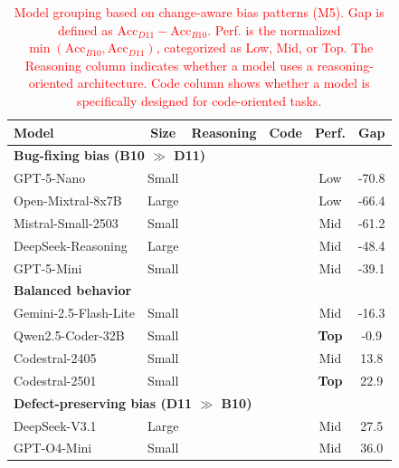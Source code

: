 \documentclass[authoryear,final,5p,times,twocolumn]{elsarticle}
\newcommand{\cmark}{\textcolor{green!60!black}{\ding{51}}}
\newcommand{\xmark}{\textcolor{red}{\ding{55}}}
\theoremstyle{plain}
\begin{document}
\begin{table}[!htbp]
\centering
\caption{
\textcolor{red}{Model grouping based on change-aware bias patterns (M5). Gap is defined as $\text{Acc}_{D11} - \text{Acc}_{B10}$. 
Perf. is the normalized $\min(\text{Acc}_{B10}, \text{Acc}_{D11})$, categorized as Low, Mid, or Top. The Reasoning column indicates whether a model uses a reasoning-oriented architecture. Code column shows whether a model is specifically designed for code-oriented tasks.}}
\label{tab:model_bias_groups}
\scriptsize
\setlength{\tabcolsep}{5pt}
\renewcommand{\arraystretch}{1.2}

\begin{tabular}{l c c c c c}
\toprule
\textbf{Model} & \textbf{Size} & \textbf{Reasoning} & \textbf{Code} & \textbf{Perf.} & \textbf{Gap} \\
\midrule

\multicolumn{6}{l}{\textbf{Bug-fixing bias (B10 $\gg$ D11)}} \\
\midrule
GPT-5-Nano & Small & \xmark & \xmark & Low & -70.8 \\
Open-Mixtral-8x7B & Large & \xmark & \xmark & Low & -66.4 \\
Mistral-Small-2503 & Small & \xmark & \xmark & Mid & -61.2 \\
DeepSeek-Reasoning & Large & \cmark & \xmark & Mid & -48.4 \\
GPT-5-Mini & Small & \xmark & \xmark & Mid & -39.1 \\
\midrule

\multicolumn{6}{l}{\textbf{Balanced behavior}} \\
\midrule
Gemini-2.5-Flash-Lite & Small & \xmark & \xmark & Mid & -16.3 \\
Qwen2.5-Coder-32B & Small & \xmark & \cmark & \textbf{Top} & -0.9 \\
Codestral-2405 & Small & \xmark & \cmark & Mid & 13.8 \\
Codestral-2501 & Small & \xmark & \cmark & \textbf{Top} & 22.9 \\
\midrule

\multicolumn{6}{l}{\textbf{Defect-preserving bias (D11 $\gg$ B10)}} \\
\midrule
DeepSeek-V3.1 & Large & \xmark & \xmark & Mid & 27.5 \\
GPT-O4-Mini & Small & \cmark & \xmark & Mid & 36.0 \\
\bottomrule
\end{tabular}
\end{table}
\end{document}
